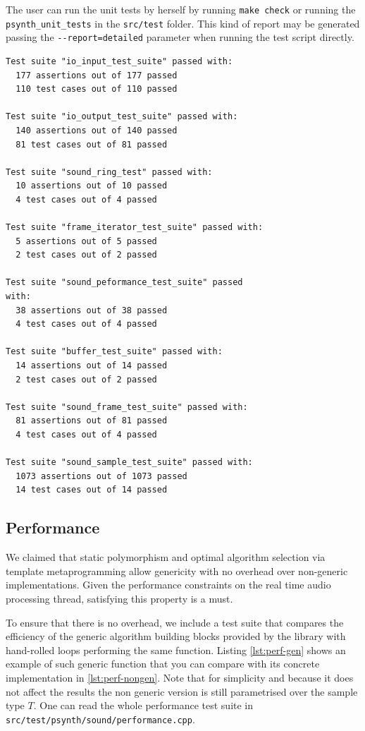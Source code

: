 \begin{mynote}
\label{note:gistests}
The user can run the unit tests by herself by running \texttt{make
  check} or running the \texttt{psynth\_unit\_tests} in the
\texttt{src/test} folder.  This kind of report may be generated
passing the \verb|--report=detailed| parameter when running the test
script directly.  {\small
\begin{verbatim}
Test suite "io_input_test_suite" passed with:
  177 assertions out of 177 passed
  110 test cases out of 110 passed

Test suite "io_output_test_suite" passed with:
  140 assertions out of 140 passed
  81 test cases out of 81 passed

Test suite "sound_ring_test" passed with:
  10 assertions out of 10 passed
  4 test cases out of 4 passed

Test suite "frame_iterator_test_suite" passed with:
  5 assertions out of 5 passed
  2 test cases out of 2 passed

Test suite "sound_peformance_test_suite" passed 
with:
  38 assertions out of 38 passed
  4 test cases out of 4 passed

Test suite "buffer_test_suite" passed with:
  14 assertions out of 14 passed
  2 test cases out of 2 passed

Test suite "sound_frame_test_suite" passed with:
  81 assertions out of 81 passed
  4 test cases out of 4 passed

Test suite "sound_sample_test_suite" passed with:
  1073 assertions out of 1073 passed
  14 test cases out of 14 passed
\end{verbatim}
}
\end{mynote}

\subsection{Performance}
\label{sec:sound-performance}

We claimed that static polymorphism and optimal algorithm selection
via template metaprogramming allow genericity with no overhead over
non-generic implementations. Given the performance constraints on the
real time audio processing thread, satisfying this property is a must.

To ensure that there is no overhead, we include a test suite that
compares the efficiency of the generic algorithm building blocks
provided by the library with hand-rolled loops performing the same
function. Listing \ref{lst:perf-gen} shows an example of such generic
function that you can compare with its concrete implementation in
\ref{lst:perf-nongen}. Note that for simplicity and because it does
not affect the results the non generic version is still parametrised
over the sample type $T$. One can read the whole performance test
suite in \texttt{src/test/psynth/sound/performance.cpp}.

